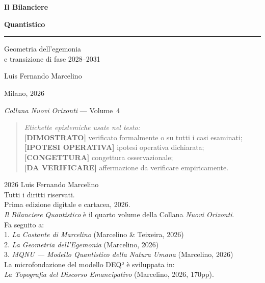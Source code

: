 \documentclass[12pt, twoside]{book}
\theoremstyle{plain}
\theoremstyle{definition}
\theoremstyle{remark}
\newcommand{\Proved}{\textnormal{\textbf{[DIMOSTRATO]}}}
\newcommand{\Hypoth}{\textnormal{\textbf{[IPOTESI OPERATIVA]}}}
\newcommand{\Conj}{\textnormal{\textbf{[CONGETTURA]}}}
\newcommand{\ToVerify}{\textnormal{\textbf{[DA VERIFICARE]}}}
\begin{document}
\begin{titlepage}
  \centering\vspace*{1.5cm}
  {\Huge\bfseries Il Bilanciere\par}
  \vspace{0.2cm}
  {\Huge\bfseries Quantistico\par}
  \vspace{0.8cm}
  \rule{0.8\linewidth}{0.5pt}
  \vspace{0.6cm}

  {\large Geometria dell'egemonia\\[0.3cm]
   e transizione di fase 2028--2031\par}
  \vspace{2cm}
  {\large Luis Fernando Marcelino\par}
  \vspace{0.5cm}
  {\normalsize Milano, 2026\par}
  \vfill
  {\small\textit{Collana Nuovi Orizonti} --- Volume~4\par}
  \vspace{0.5cm}
  \begin{small}\begin{quote}
    \textit{Etichette epistemiche usate nel testo:}\\[2pt]
    \Proved{} verificato formalmente o su tutti i casi esaminati;\\
    \Hypoth{} ipotesi operativa dichiarata;\\
    \Conj{} congettura osservazionale;\\
    \ToVerify{} affermazione da verificare empiricamente.
  \end{quote}\end{small}
\end{titlepage}

\thispagestyle{empty}
\vspace*{\fill}
\begin{small}
\noindent \textcopyright{} 2026 Luis Fernando Marcelino\\[4pt]
Tutti i diritti riservati.\\[4pt]
Prima edizione digitale e cartacea, 2026.\\[4pt]
\textit{Il Bilanciere Quantistico} è il quarto volume della Collana \textit{Nuovi Orizonti}.\\[4pt]
Fa seguito a:\\
1. \textit{La Costante di Marcelino} (Marcelino \& Teixeira, 2026)\\
2. \textit{La Geometria dell'Egemonia} (Marcelino, 2026)\\
3. \textit{MQNU — Modello Quantistico della Natura Umana} (Marcelino, 2026)\\[4pt]
La microfondazione del modello DEQ² è sviluppata in:\\
\textit{La Topografia del Discorso Emancipativo} (Marcelino, 2026, 170pp).
\end{small}
\vspace*{\fill}
\clearpage
\end{document}
